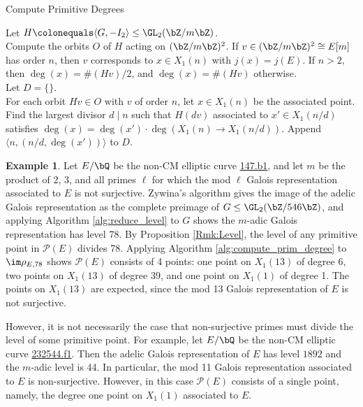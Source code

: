 \documentclass[11pt,reqno]{amsart}
\theoremstyle{plain}
\theoremstyle{definition}
\newtheorem{example}[theorem]{Example}
\newcommand{\Q}{\bQ}
\newcommand{\Z}{\bZ}
\begin{document}
\begin{algorithm}[H] \caption{Compute Primitive Degrees}\label{alg:compute_prim_degree}
  \KwIn{$G\leq \GL_2(\Z/m\Z)$ such that $\im\rho_{E,m}=G$.}
  Let $H \colonequals \langle G, -I_2\rangle \leq \GL_2(\Z/m\Z)$.\\
  Compute the orbits $O$ of $H$ acting on $(\Z/m\Z)^2$\label{Inc-1}. If $v\in (\Z/m\Z)^2 \cong E[m]$ has order $n$, then $v$ corresponds to $x\in X_1(n)$ with $j(x)=j(E)$. If $n>2$, then $\deg(x)=\#(Hv)/2$, and $\deg(x)=\#(Hv)$ otherwise.\\
   Let $D= \{\}$.\\
  For each orbit $Hv \in O$ with $v$ of order $n$, let $x \in X_1(n)$ be the associated point. Find the largest divisor $d\mid n$ such that $H(dv)$ associated to $x' \in X_1(n/d)$ satisfies $\deg(x)=\deg(x') \cdot \deg(X_1(n) \rightarrow X_1(n/d))$. Append $\langle n, (n/d, \deg(x'))\rangle$ to $D$.\label{alg:compute_primitive_degrees:minimal_levels}\\
\end{algorithm}

\begin{example}
Let $E/\Q$ be the non-CM elliptic curve \href{https://www.lmfdb.org/EllipticCurve/Q/147/b/1}{147.b1}, and let $m$ be the product of 2, 3, and all primes $\ell$ for which the mod $\ell$ Galois representation associated to $E$ is not surjective. Zywina's algorithm \cite{ZywinaAlgorithm} gives the image of the adelic Galois representation as the complete preimage of $G \leq \GL_2(\Z/546\Z)$, and applying Algorithm \ref{alg:reduce_level} to $G$ shows the $m$-adic Galois representation has level 78. By Proposition \ref{Rmk:Level}, the level of any primitive point in $\mathcal{P}(E)$ divides 78. Applying Algorithm \ref{alg:compute_prim_degree} to $\im \rho_{E,78}$ shows $\mathcal{P}(E)$ consists of 4 points: one point on $X_1(13)$ of degree 6, two points on $X_1(13)$ of degree 39, and one point on $X_1(1)$ of degree 1. The points on $X_1(13)$ are expected, since the mod 13 Galois representation of $E$ is not surjective. 

However, it is not necessarily the case that non-surjective primes must divide the level of some primitive point. For example, let $E/\Q$ be the non-CM elliptic curve \href{https://www.lmfdb.org/EllipticCurve/Q/232544/f/1}{232544.f1}. Then the adelic Galois representation of $E$ has level $1892$ and the $m$-adic level is 44. In particular, the mod 11 Galois representation associated to $E$ is non-surjective. However, in this case $\mathcal{P}(E)$ consists of a single point, namely, the degree one point on $X_1(1)$ associated to $E$.
\end{example}
\end{document}

